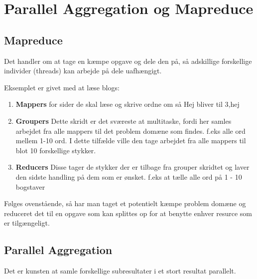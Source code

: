 \documentclass[../SWD_disp.tex]{subfiles}
\begin{document}
\section{Parallel Aggregation og Mapreduce}
\subsection{Mapreduce}
Det handler om at tage en kæmpe opgave og dele den på, så adskillige forskellige individer (threads) kan arbejde på dele uafhængigt.

Eksemplet er givet med at læse blogs:
\begin{enumerate}
	\item \textbf{Mappers} for sider de skal læse og skrive ordne om så Hej bliver til 3,hej
	\item \textbf{Groupers} Dette skridt er det sværeste at multitaske, fordi her samles arbejdet fra alle mappers til det problem domæne som findes. f.eks alle ord mellem 1-10 ord. I dette tilfælde ville den tage arbejdet fra alle mappers til blot 10 forskellige stykker.
	\item \textbf{Reducers} Disse tager de stykker der er tilbage fra grouper skridtet og laver den sidste handling på dem som er ønsket. f.eks at tælle alle ord på 1 - 10 bogstaver
\end{enumerate}
Følges ovenstående, så har man taget et potentielt kæmpe problem domæne og reduceret det til en opgave som kan splittes op for at benytte enhver resurce som er tilgængeligt.

\subsection{Parallel Aggregation}
Det er kunsten at samle forskellige subresultater i et stort resultat parallelt.
\end{document}
